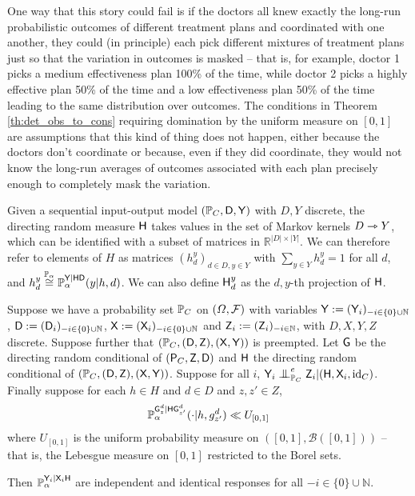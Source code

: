 One way that this story could fail is if the doctors all knew exactly the long-run probabilistic outcomes of different treatment plans and coordinated with one another, they could (in principle) each pick different mixtures of treatment plans just so that the variation in outcomes is masked -- that is, for example, doctor 1 picks a medium effectiveness plan 100\% of the time, while doctor 2 picks a highly effective plan 50\% of the time and a low effectiveness plan 50\% of the time leading to the same distribution over outcomes. The conditions in Theorem \ref{th:det_obs_to_cons} requiring domination by the uniform measure on $[0,1]$ are assumptions that this kind of thing does not happen, either because the doctors don't coordinate or because, even if they did coordinate, they would not know the long-run averages of outcomes associated with each plan precisely enough to completely mask the variation.

\begin{notation}
Given a sequential input-output model $(\mathbb{P}_C,\mathsf{D},\mathsf{Y})$ with $D,Y$ discrete, the directing random measure $\mathsf{H}$ takes values in the set of Markov kernels $D\rightarrowtriangle Y$, which can be identified with a subset of matrices in $\mathbb{R}^{|D|\times |Y|}$. We can therefore refer to elements of $H$ as matrices $(h_d^y)_{d\in D,y\in Y}$ with $\sum_{y\in Y} h_d^y = 1$ for all $d$, and $h_d^y\overset{\mathbb{P}_\alpha}{\cong}\mathbb{P}_\alpha^{\mathsf{Y}|\mathsf{H}\mathsf{D}}(y|h,d)$. We can also define $\mathsf{H}_d^y$ as the $d,y$-th projection of $\mathsf{H}$.
\end{notation}

\begin{theorem}\label{th:det_obs_to_cons}
Suppose we have a probability set $\mathbb{P}_C$ on $(\Omega,\mathcal{F})$ with variables $\mathsf{Y}:=(\mathsf{Y}_i)_{-i\in \{0\}\cup\mathbb{N}}$, $\mathsf{D}:=(\mathsf{D}_i)_{-i\in \{0\}\cup\mathbb{N}}$, $\mathsf{X}:=(\mathsf{X}_i)_{-i\in \{0\}\cup\mathbb{N}}$ and $\mathsf{Z}_i:= (\mathsf{Z}_i)_{-i\in \mathbb{N}}$, with $D,X,Y,Z$ discrete. Suppose further that $(\mathbb{P}_C,(\mathsf{D},\mathsf{Z}),(\mathsf{X},\mathsf{Y}))$ is preempted. Let $\mathsf{G}$ be the directing random conditional of $(\mathsf{P}_C,\mathsf{Z},\mathsf{D})$ and $\mathsf{H}$ the directing random conditional of $(\mathbb{P}_C,(\mathsf{D},\mathsf{Z}),(\mathsf{X},\mathsf{Y}))$. Suppose for all $i$, $\RV{Y}_i\CI^e_{\prob{P}_C} \RV{Z}_i|(\RV{H},\RV{X}_i,\text{id}_C)$. Finally suppose for each $h\in H$ and $d\in D$ and $z,z'\in Z$,
\begin{align}
    \mathbb{P}_\alpha^{\mathsf{G}^d_{z}|\mathsf{H}\mathsf{G}^d_{z'}}(\cdot|h,g^d_{z'}) \ll U_{[0,1]}\label{eq:lebesgue_dom}
\end{align}
where $U_{[0,1]}$ is the uniform probability measure on $([0,1],\mathcal{B}([0,1]))$ -- that is, the Lebesgue measure on $[0,1]$ restricted to the Borel sets.

Then $\mathbb{P}_\alpha^{\mathsf{Y}_i|\mathsf{X}_i\mathsf{H}}$ are independent and identical responses for all $-i\in\{0\}\cup\mathbb{N}$.
\end{theorem}

